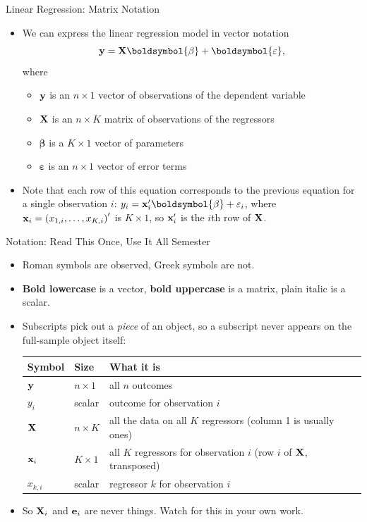 \documentclass[aspectratio=169,11pt]{beamer}
\begin{document}
\begin{frame}{Linear Regression: Matrix Notation}
	\begin{itemize}
	\item We can express the linear regression model in vector notation
	\begin{equation*}
		{\bf y}= {\bf X} \boldsymbol{\beta} + \boldsymbol{\varepsilon},
	\end{equation*}
	where 
	\begin{itemize}
		\item ${\bf y}$ is an $n\times 1$ vector of observations of the dependent variable
		\item ${\bf X}$ is an $n\times K$ matrix of observations of the regressors
		\item $\boldsymbol{\beta} $ is a $K\times 1$ vector of parameters
		\item $\boldsymbol{\varepsilon}$ is an $n\times 1$ vector of error terms
	\end{itemize}

	\item Note that each row of this equation corresponds to the previous equation for
	a single observation $i$:
	$y_i = {\bf x}_{i}'\boldsymbol{\beta} + \varepsilon_i$,
	where ${\bf x}_i = \left(x_{1,i},\dots,x_{K,i}\right)'$ is $K\times 1$, so ${\bf x}_i'$ is the $i$th row of ${\bf X}$.
\end{itemize}
\end{frame}

\begin{frame}{Notation: Read This Once, Use It All Semester}
\begin{itemize}
	\item Roman symbols are observed, Greek symbols are not.
	\item {\bf Bold lowercase} is a vector, {\bf bold uppercase} is a matrix, plain italic is a scalar.
	\medskip
	\item Subscripts pick out a \emph{piece} of an object, so a subscript never appears on the
	full-sample object itself:
	\begin{center}
	\begin{tabular}{lll}
	\hline
	Symbol & Size & What it is \\
	\hline
	${\bf y}$ & $n\times 1$ & all $n$ outcomes \\
	$y_{i}$ & scalar & outcome for observation $i$ \\
	${\bf X}$ & $n\times K$ & all the data on all $K$ regressors (column 1 is usually ones) \\
	${\bf x}_{i}$ & $K\times 1$ & all $K$ regressors for observation $i$ (row $i$ of ${\bf X}$, transposed) \\
	$x_{k,i}$ & scalar & regressor $k$ for observation $i$ \\
	\hline
	\end{tabular}
	\end{center}
	\medskip
	\item So ${\bf X}_{i}$ and ${\bf e}_{i}$ are never things. Watch for this in your own work.
\end{itemize}
\end{frame}
\end{document}
